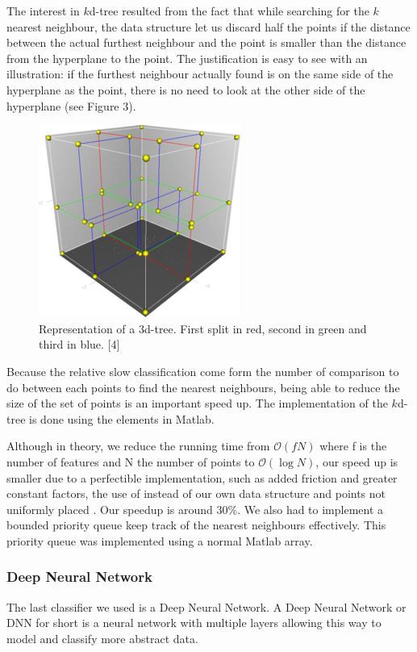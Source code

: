 \documentclass{article} %
\begin{document}
The interest in $k$d-tree resulted from the fact that while searching for the $k$ nearest neighbour, the data structure let us discard half the points if the distance between the actual furthest neighbour and the point is smaller than the distance from the hyperplane to the point. The justification is easy to see with an illustration: if the furthest neighbour actually found is on the same side of the hyperplane as the point, there is no need to look at the other side of the hyperplane (see Figure 3).
\begin{figure}
\centering
\includegraphics[scale=0.8]{3dtree.png}
\caption{Representation of a $3$d-tree. First split in red, second in green and third in blue. [4]}
\end{figure}
Because the relative slow classification come form the number of comparison to do between each points to find the nearest neighbours, being able to reduce the size of the set of points is an important speed up. The implementation of the $k$d-tree is done using the  elements in Matlab. 

Although in theory, we reduce the running time from $\mathcal{O}(fN)$ where f is the number of features and N the number of points to $\mathcal{O}(\log N)$, our speed up is smaller due to a perfectible implementation, such as added friction and greater constant factors, the use of  instead of our own data structure and points not uniformly placed . Our speedup is around $30\%$.
We also had to implement a bounded priority queue keep track of the nearest neighbours effectively. This priority queue was implemented using a normal Matlab array.


\subsubsection{Deep Neural Network}

The last classifier we used is a Deep Neural Network. A Deep Neural Network or DNN for short is a neural network with multiple layers allowing this way to model and classify more abstract data. 
\end{document}
